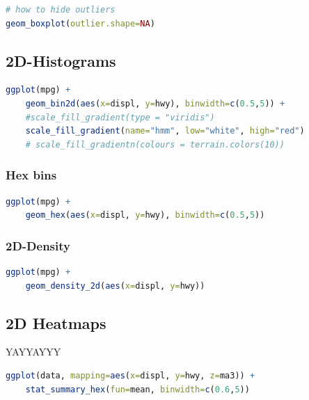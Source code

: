 \documentclass{article}
\begin{document}
\begin{multicols}{2}
\begin{itemize}
\begin{lstlisting}[language=R]
# how to hide outliers
geom_boxplot(outlier.shape=NA)
\end{lstlisting}
\end{itemize}

\subsection{2D-Histograms}
\begin{lstlisting}[language=R]
ggplot(mpg) +
	geom_bin2d(aes(x=displ, y=hwy), binwidth=c(0.5,5)) +
	#scale_fill_gradient(type = "viridis")
	scale_fill_gradient(name="hmm", low="white", high="red")
	# scale_fill_gradientn(colours = terrain.colors(10))
\end{lstlisting}

\subsubsection{Hex bins}
\begin{lstlisting}[language=R]
ggplot(mpg) +
	geom_hex(aes(x=displ, y=hwy), binwidth=c(0.5,5))
\end{lstlisting}

\subsubsection{2D-Density}
\begin{lstlisting}[language=R]
ggplot(mpg) +
	geom_density_2d(aes(x=displ, y=hwy))
\end{lstlisting}
\subsection{2D Heatmaps}
YAYYAYYY
\begin{lstlisting}[language=R]
ggplot(data, mapping=aes(x=displ, y=hwy, z=ma3)) +
	stat_summary_hex(fun=mean, binwidth=c(0.6,5))
\end{lstlisting}

\end{multicols}
\end{document}
